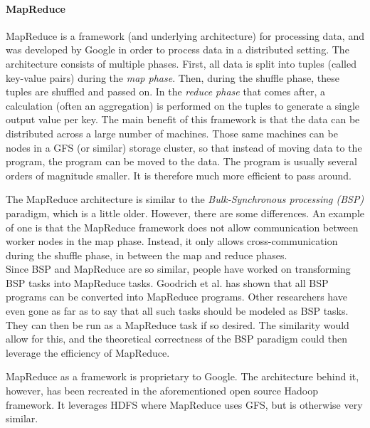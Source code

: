 \paragraph{MapReduce}
MapReduce is a framework (and underlying architecture) for processing data, and was developed by Google\cite{Dean04} in order to process data in a distributed setting. The architecture consists of multiple phases. First, all data is split into tuples (called key-value pairs) during the \textit{map phase}. Then, during the shuffle phase, these tuples are shuffled and passed on. In the \textit{reduce phase} that comes after, a calculation (often an aggregation) is performed on the tuples to generate a single output value per key. The main benefit of this framework is that the data can be distributed across a large number of machines. Those same machines can be nodes in a GFS (or similar) storage cluster, so that instead of moving data to the program, the program can be moved to the data. The program is usually several orders of magnitude smaller. It is therefore much more efficient to pass around. %

The MapReduce architecture is similar to the \textit{Bulk-Synchronous processing (BSP)} paradigm, which is a little older. However, there are some differences. An example of one is that the MapReduce framework does not allow communication between worker nodes in the map phase. Instead, it only allows cross-communication during the shuffle phase, in between the map and reduce phases\cite{Pace12}.\\
Since BSP and MapReduce are so similar, people have worked on transforming BSP tasks into MapReduce tasks. Goodrich et al.\cite{Goo11} has shown that all BSP programs can be converted into MapReduce programs. Other researchers have even gone as far as to say that all such tasks should be modeled as BSP tasks. They can then be run as a MapReduce task if so desired. The similarity would allow for this, and the theoretical correctness of the BSP paradigm could then leverage the efficiency of MapReduce\cite{Pace12}.

MapReduce as a framework is proprietary to Google. The architecture behind it, however, has been recreated in the aforementioned open source Hadoop framework. It leverages HDFS where MapReduce uses GFS, but is otherwise very similar.

